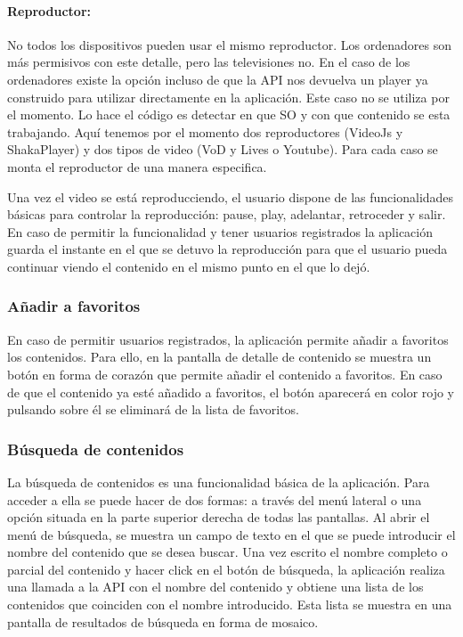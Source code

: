 \paragraph{Reproductor:} No todos los dispositivos pueden usar el mismo reproductor. Los ordenadores son más permisivos con este detalle, pero las televisiones no. En 
el caso de los ordenadores existe la opción incluso de que la API nos devuelva un player ya construido para utilizar directamente en la aplicación. Este caso no se utiliza
por el momento. Lo hace el código es detectar en que SO y con que contenido se esta trabajando. Aquí tenemos por el momento dos reproductores (VideoJs y ShakaPlayer) y dos 
tipos de video (VoD y Lives o Youtube). Para cada caso se monta el reproductor de una manera especifica. 

Una vez el video se está reproducciendo, el usuario dispone de las funcionalidades básicas para controlar la reproducción: pause, play, adelantar, retroceder y salir. 
En caso de permitir la funcionalidad y tener usuarios registrados la aplicación guarda el instante en el que se detuvo la reproducción para que el usuario pueda
continuar viendo el contenido en el mismo punto en el que lo dejó.

\subsubsection{Añadir a favoritos}
\label{sec:anadir_favoritos}

En caso de permitir usuarios registrados, la aplicación permite añadir a favoritos los contenidos. Para ello, en la pantalla de detalle de contenido se muestra un 
botón en forma de corazón que permite añadir el contenido a favoritos. En caso de que el contenido ya esté añadido a favoritos, el botón aparecerá en color rojo y pulsando
sobre él se eliminará de la lista de favoritos.

\subsubsection{Búsqueda de contenidos}
\label{sec:busqueda_contenidos}

La búsqueda de contenidos es una funcionalidad básica de la aplicación. Para acceder a ella se puede hacer de dos formas: a través del menú lateral o una opción 
situada en la parte superior derecha de todas las pantallas. Al abrir el menú de búsqueda, se muestra un campo de texto en el que se puede introducir el nombre del
contenido que se desea buscar. Una vez escrito el nombre completo o parcial del contenido y hacer click en el botón de búsqueda, la aplicación realiza una llamada a la
API con el nombre del contenido y obtiene una lista de los contenidos que coinciden con el nombre introducido. Esta lista se muestra en una pantalla de resultados de
búsqueda en forma de mosaico. 

